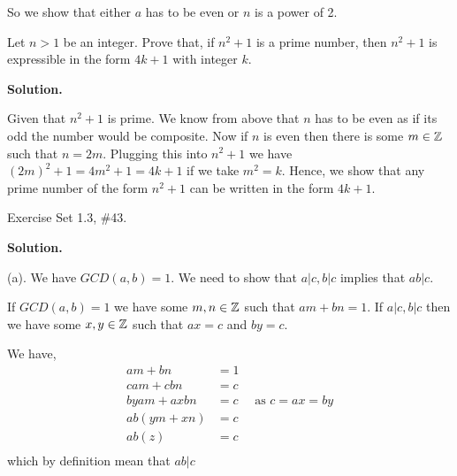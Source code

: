 \documentclass[12pt]{exam}
\begin{document}
\begin{questions}
So we show that either $a$ has to be even or  $n$ is a power of 2.


\newpage 
\question Let $n >1$ be an  integer. Prove that, if
$ n ^2   + 1 $ is a prime number, then $n^2 + 1$ is expressible in the form $4k + 1$ with integer $k$. 

\textbf{Solution. } 

    Given that $n^2 + 1$ is prime. We know from above that $n$ has to be even as if its odd the number would be composite. Now if $n$ is even then there is some $m \in \mathbb{Z}$ such that  $n = 2m$. Plugging this into  $n^2 + 1$ we have $(2m)^2 + 1 = 4m^2 + 1 = 4k + 1$ if we take $m^2 = k$. Hence, we show that any prime number of the form $n^2 + 1$  can be written in the form $4k + 1$.




\newpage 
\question  Exercise Set 1.3, \#43.  

\textbf{Solution. } 

(a). We have $GCD(a, b) = 1$. We need to show that  $a | c, b | c $ implies that  $ab | c$.

If $ GCD(a, b)= 1$ we have  some $m,n \in \mathbb{Z}$ such that $am + bn = 1$. If  $a | c, b | c$ then we have  some  $x,y \in \mathbb{Z}$ such that  $ax = c$ and  $by = c$.

We have, 
\begin{align*}
    am + bn &= 1\\
    cam + cbn &= c\\
    byam + axbn &= c \quad \text{ as $c = ax = by$}\\
    ab(ym + xn) &= c \\
    ab(z) &= c \\
\end{align*}
which by definition mean that $ab | c$



\end{questions}
\end{document}
